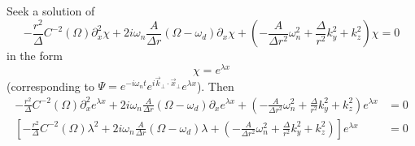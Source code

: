 \documentclass[english]{article}
\begin{document}
Seek a solution of 
\[
-\frac{r^{2}}{\Delta}C^{-2}\left(\Omega\right)\partial^{2}_{x}\chi+2i\omega_{n}\frac{A}{\Delta r}\left(\Omega-\omega_{d}\right)\partial_{x}\chi+\left(-\frac{A}{\Delta r^{2}}\omega^{2}_{n}+\frac{\Delta}{r^{2}}k^{2}_{y}+k^{2}_{z}\right)\chi=0
\]
 in the form 
\[
\chi=e^{\lambda x}
\]
 (corresponding to $\Psi=e^{-i\omega_{n}t}e^{i\vec{k}_{\bot}\cdot\vec{x}_{\bot}}e^{\lambda x}$).
Then 
\begin{align*}
-\frac{r^{2}}{\Delta}C^{-2}\left(\Omega\right)\partial^{2}_{x}e^{\lambda x}+2i\omega_{n}\frac{A}{\Delta r}\left(\Omega-\omega_{d}\right)\partial_{x}e^{\lambda x}+\left(-\frac{A}{\Delta r^{2}}\omega^{2}_{n}+\frac{\Delta}{r^{2}}k^{2}_{y}+k^{2}_{z}\right)e^{\lambda x} & =0\\
\left[-\frac{r^{2}}{\Delta}C^{-2}\left(\Omega\right)\lambda^{2}+2i\omega_{n}\frac{A}{\Delta r}\left(\Omega-\omega_{d}\right)\lambda+\left(-\frac{A}{\Delta r^{2}}\omega^{2}_{n}+\frac{\Delta}{r^{2}}k^{2}_{y}+k^{2}_{z}\right)\right]e^{\lambda x} & =0
\end{align*}
\end{document}
